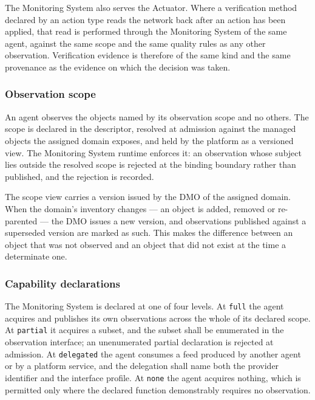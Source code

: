 The Monitoring System also serves the Actuator. Where a verification
method declared by an action type reads the network back after an action
has been applied, that read is performed through the Monitoring System
of the same agent, against the same scope and the same quality rules as
any other observation. Verification evidence is therefore of the same
kind and the same provenance as the evidence on which the decision was
taken.

\hypertarget{observation-scope}{%
\subsubsection{Observation scope}\label{observation-scope}}

An agent observes the objects named by its observation scope and no
others. The scope is declared in the descriptor, resolved at admission
against the managed objects the assigned domain exposes, and held by the
platform as a versioned view. The Monitoring System runtime enforces it:
an observation whose subject lies outside the resolved scope is rejected
at the binding boundary rather than published, and the rejection is
recorded.

The scope view carries a version issued by the DMO of the assigned
domain. When the domain's inventory changes --- an object is added,
removed or re-parented --- the DMO issues a new version, and
observations published against a superseded version are marked as such.
This makes the difference between an object that was not observed and an
object that did not exist at the time a determinate one.

\hypertarget{capability-declarations}{%
\subsubsection{Capability declarations}\label{capability-declarations}}

The Monitoring System is declared at one of four levels. At
\texttt{full} the agent acquires and publishes its own observations
across the whole of its declared scope. At \texttt{partial} it acquires
a subset, and the subset shall be enumerated in the observation
interface; an unenumerated partial declaration is rejected at admission.
At \texttt{delegated} the agent consumes a feed produced by another
agent or by a platform service, and the delegation shall name both the
provider identifier and the interface profile. At \texttt{none} the
agent acquires nothing, which is permitted only where the declared
function demonstrably requires no observation.

